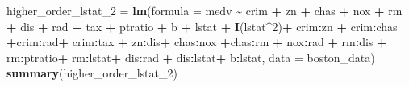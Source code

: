 \documentclass[
]{article}
\newenvironment{Shaded}{\begin{snugshade}}{\end{snugshade}}
\newcommand{\AttributeTok}[1]{\textcolor[rgb]{0.13,0.29,0.53}{#1}}
\newcommand{\DecValTok}[1]{\textcolor[rgb]{0.00,0.00,0.81}{#1}}
\newcommand{\FunctionTok}[1]{\textcolor[rgb]{0.13,0.29,0.53}{\textbf{#1}}}
\newcommand{\NormalTok}[1]{#1}
\newcommand{\OtherTok}[1]{\textcolor[rgb]{0.56,0.35,0.01}{#1}}
\newcommand{\SpecialCharTok}[1]{\textcolor[rgb]{0.81,0.36,0.00}{\textbf{#1}}}
\begin{document}
\begin{Shaded}
\begin{Highlighting}[]
\NormalTok{higher\_order\_lstat\_2 }\OtherTok{=} \FunctionTok{lm}\NormalTok{(}\AttributeTok{formula =}\NormalTok{ medv }\SpecialCharTok{\textasciitilde{}}\NormalTok{ crim }\SpecialCharTok{+}\NormalTok{ zn }\SpecialCharTok{+}\NormalTok{ chas }\SpecialCharTok{+}\NormalTok{ nox }\SpecialCharTok{+}\NormalTok{ rm }\SpecialCharTok{+}\NormalTok{ dis }\SpecialCharTok{+}\NormalTok{ rad }\SpecialCharTok{+}\NormalTok{ tax }\SpecialCharTok{+}\NormalTok{ ptratio }\SpecialCharTok{+}\NormalTok{ b }\SpecialCharTok{+}\NormalTok{ lstat }\SpecialCharTok{+} \FunctionTok{I}\NormalTok{(lstat}\SpecialCharTok{\^{}}\DecValTok{2}\NormalTok{)}\SpecialCharTok{+}\NormalTok{ crim}\SpecialCharTok{:}\NormalTok{zn }\SpecialCharTok{+}\NormalTok{ crim}\SpecialCharTok{:}\NormalTok{chas  }\SpecialCharTok{+}\NormalTok{crim}\SpecialCharTok{:}\NormalTok{rad}\SpecialCharTok{+}\NormalTok{ crim}\SpecialCharTok{:}\NormalTok{tax }\SpecialCharTok{+}\NormalTok{ zn}\SpecialCharTok{:}\NormalTok{dis}\SpecialCharTok{+}\NormalTok{ chas}\SpecialCharTok{:}\NormalTok{nox }\SpecialCharTok{+}\NormalTok{chas}\SpecialCharTok{:}\NormalTok{rm }\SpecialCharTok{+}\NormalTok{ nox}\SpecialCharTok{:}\NormalTok{rad }\SpecialCharTok{+}\NormalTok{ rm}\SpecialCharTok{:}\NormalTok{dis }\SpecialCharTok{+}\NormalTok{ rm}\SpecialCharTok{:}\NormalTok{ptratio}\SpecialCharTok{+}\NormalTok{ rm}\SpecialCharTok{:}\NormalTok{lstat}\SpecialCharTok{+}\NormalTok{ dis}\SpecialCharTok{:}\NormalTok{rad }\SpecialCharTok{+}\NormalTok{ dis}\SpecialCharTok{:}\NormalTok{lstat}\SpecialCharTok{+}\NormalTok{ b}\SpecialCharTok{:}\NormalTok{lstat, }\AttributeTok{data =}\NormalTok{ boston\_data)}
\FunctionTok{summary}\NormalTok{(higher\_order\_lstat\_2)}
\end{Highlighting}
\end{Shaded}
\end{document}
